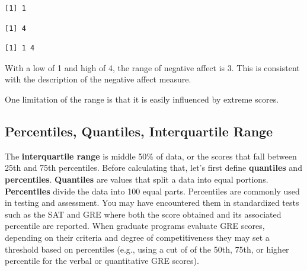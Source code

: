 \documentclass[
  11pt,
]{book}
\newenvironment{Shaded}{\begin{snugshade}}{\end{snugshade}}
\newcommand{\FunctionTok}[1]{\textcolor[rgb]{0.27,0.27,0.27}{\textbf{#1}}}
\newcommand{\NormalTok}[1]{#1}
\newcommand{\SpecialCharTok}[1]{\textcolor[rgb]{0.43,0.43,0.43}{\textbf{#1}}}
\begin{document}
\begin{Shaded}
\end{Shaded}

\begin{verbatim}
[1] 1
\end{verbatim}

\begin{Shaded}
\end{Shaded}

\begin{verbatim}
[1] 4
\end{verbatim}

\begin{Shaded}
\end{Shaded}

\begin{verbatim}
[1] 1 4
\end{verbatim}

With a low of 1 and high of 4, the range of negative affect is 3. This is consistent with the description of the negative affect measure.

One limitation of the range is that it is easily influenced by extreme scores.

\hypertarget{percentiles-quantiles-interquartile-range}{%
\subsection{Percentiles, Quantiles, Interquartile Range}\label{percentiles-quantiles-interquartile-range}}

The \textbf{interquartile range} is middle 50\% of data, or the scores that fall between 25th and 75th percentiles. Before calculating that, let's first define \textbf{quantiles} and \textbf{percentiles}. \textbf{Quantiles} are values that split a data into equal portions. \textbf{Percentiles} divide the data into 100 equal parts. Percentiles are commonly used in testing and assessment. You may have encountered them in standardized tests such as the SAT and GRE where both the score obtained and its associated percentile are reported. When graduate programs evaluate GRE scores, depending on their criteria and degree of competitiveness they may set a threshold based on percentiles (e.g., using a cut of of the 50th, 75th, or higher percentile for the verbal or quantitative GRE scores).
\end{document}
